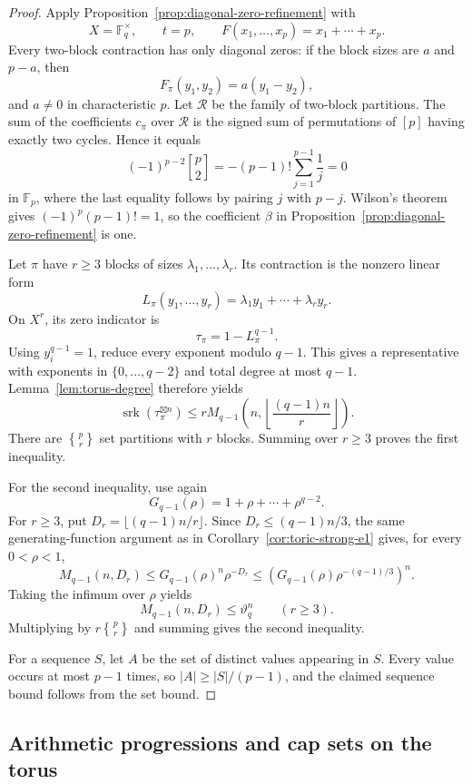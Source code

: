 \documentclass[10pt,a4paper]{amsart}
\theoremstyle{definition}
\newcommand{\F}{\mathbb F}
\newcommand{\srk}{\operatorname{srk}}
\newcommand{\boxt}{\boxtimes}
\newcommand{\1}{\mathbf 1}
\newcommand{\StirlingTwo}[2]{\genfrac\{\}{0pt}{}{#1}{#2}}
\newcommand{\StirlingOne}[2]{\genfrac[]{0pt}{}{#1}{#2}}
\begin{document}
\begin{proof}
Apply Proposition~\ref{prop:diagonal-zero-refinement} with
\[
 X=\F_q^\times,\qquad t=p,\qquad
 F(x_1,\ldots,x_p)=x_1+\cdots+x_p.
\]  {Every two-block contraction has only diagonal zeros:} if the block sizes are $a$ and $p-a$, then
\[
 F_\pi(y_1,y_2)=a(y_1-y_2),
\]
and $a\ne0$ in characteristic $p$.  Let $\mathcal R$ be the family of two-block partitions.  The sum of the coefficients $c_\pi$ over $\mathcal R$ is the signed sum of permutations of $[p]$ having exactly two cycles.  Hence it equals
\[
 (-1)^{p-2}\StirlingOne{p}{2}
 =-(p-1)!\sum_{j=1}^{p-1}\frac1j=0
\]
in $\F_p$, where the last equality follows by pairing $j$ with $p-j$.  Wilson's theorem gives $(-1)^p(p-1)!=1$, so the coefficient $\beta$ in Proposition~\ref{prop:diagonal-zero-refinement} is one.

Let $\pi$ have $r\ge3$ blocks of sizes $\lambda_1,\ldots,\lambda_r$.  Its contraction is the nonzero linear form
\[
 L_\pi(y_1,\ldots,y_r)=\lambda_1y_1+\cdots+\lambda_ry_r.
\]
On $X^r$, its zero indicator is
\[
 \tau_\pi=1-L_\pi^{q-1}.
\]
Using $y_i^{q-1}=1$, reduce every exponent modulo $q-1$.  This gives a representative with exponents in $\{0,\ldots,q-2\}$ and total degree at most $q-1$.  Lemma~\ref{lem:torus-degree} therefore yields
\[
 \srk(\tau_\pi^{\boxt n})
 \le rM_{q-1}\left(n,\left\lfloor\frac{(q-1)n}{r}\right\rfloor\right).
\]
There are $\StirlingTwo{p}{r}$ set partitions with $r$ blocks.  Summing over $r\ge3$ proves the first inequality.

For the second inequality, use again
\[
 G_{q-1}(\rho)=1+\rho+\cdots+\rho^{q-2}.
\]
For $r\ge3$, put $D_r=\lfloor(q-1)n/r\rfloor$.  Since
$D_r\le(q-1)n/3$, the same generating-function argument as in Corollary~\ref{cor:toric-strong-e1} gives, for every $0<\rho<1$,
\[
 M_{q-1}(n,D_r)
 \le G_{q-1}(\rho)^n\rho^{-D_r}
 \le\left(G_{q-1}(\rho)\rho^{-(q-1)/3}\right)^n.
\]
Taking the infimum over $\rho$ yields
\[
 M_{q-1}(n,D_r)\le\vartheta_q^n
 \qquad(r\ge3).
\]
Multiplying by $r\StirlingTwo{p}{r}$ and summing gives the second inequality.

{For a sequence $S$, let $A$ be the set of distinct values appearing in $S$.  Every value occurs at most $p-1$ times, so $|A|\ge |S|/(p-1)$, and the claimed sequence bound follows from the set bound.}
\end{proof}


\subsection{Arithmetic progressions and cap sets on the torus}
\end{document}
